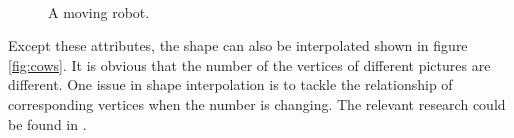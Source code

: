 \begin{figure}
\centering
{}
\\
\caption{A moving robot.}
\label{fig:movingRobot}
\end{figure}
Except these attributes, the shape can also be interpolated shown in figure \ref{fig:cows}. It is obvious that the number of the vertices of different pictures are different. One issue in shape interpolation is to tackle the relationship of corresponding vertices when the number is changing. The relevant research could be found in \cite{2d_shape}. 
